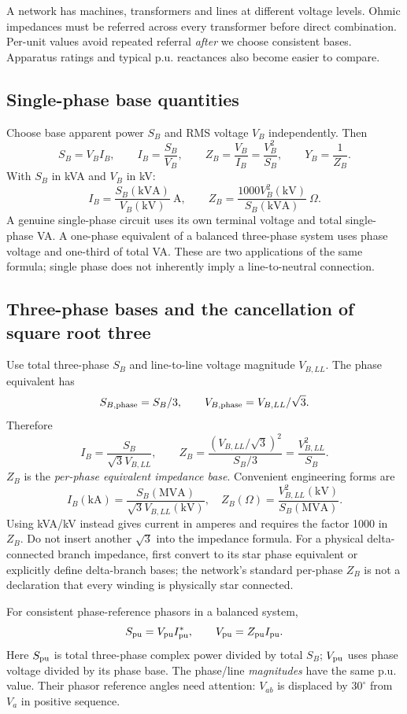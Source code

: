 \documentclass[11pt,a4paper]{article}
\newcommand{\ans}[1]{\boxed{#1}}
\begin{document}
A network has machines, transformers and lines at different voltage levels. Ohmic impedances must be referred across every transformer before direct combination. Per-unit values avoid repeated referral \emph{after} we choose consistent bases. Apparatus ratings and typical p.u. reactances also become easier to compare.
\subsection{Single-phase base quantities}
Choose base apparent power $S_B$ and RMS voltage $V_B$ independently. Then
\[
 S_B=V_B I_B,\qquad I_B=\frac{S_B}{V_B},\qquad
 Z_B=\frac{V_B}{I_B}=\frac{V_B^2}{S_B},\qquad Y_B=\frac1{Z_B}.
\]
With $S_B$ in kVA and $V_B$ in kV:
\[
 I_B=\frac{S_B(\mathrm{kVA})}{V_B(\mathrm{kV})}\ \mathrm A,\qquad
 Z_B=\frac{1000V_B^2(\mathrm{kV})}{S_B(\mathrm{kVA})}\ \Omega.
\]
A genuine single-phase circuit uses its own terminal voltage and total single-phase VA. A one-phase equivalent of a balanced three-phase system uses phase voltage and one-third of total VA. These are two applications of the same formula; single phase does not inherently imply a line-to-neutral connection.
\subsection{Three-phase bases and the cancellation of square root three}
Use total three-phase $S_B$ and line-to-line voltage magnitude $V_{B,LL}$. The phase equivalent has
\[
 S_{B,\rm phase}=S_B/3,\qquad V_{B,\rm phase}=V_{B,LL}/\sqrt3.
\]
Therefore
\[
 \ans{I_B=\frac{S_B}{\sqrt3V_{B,LL}}},\qquad
 \ans{Z_B=\frac{(V_{B,LL}/\sqrt3)^2}{S_B/3}=\frac{V_{B,LL}^2}{S_B}}.
\]
$Z_B$ is the \emph{per-phase equivalent impedance base}. Convenient engineering forms are
\[
 I_B(\mathrm{kA})=\frac{S_B(\mathrm{MVA})}{\sqrt3V_{B,LL}(\mathrm{kV})},\quad
 Z_B(\Omega)=\frac{V_{B,LL}^2(\mathrm{kV})}{S_B(\mathrm{MVA})}.
\]
Using kVA/kV instead gives current in amperes and requires the factor 1000 in $Z_B$. Do not insert another $\sqrt3$ into the impedance formula. For a physical delta-connected branch impedance, first convert to its star phase equivalent or explicitly define delta-branch bases; the network's standard per-phase $Z_B$ is not a declaration that every winding is physically star connected.

For consistent phase-reference phasors in a balanced system,
\[
 S_{\rm pu}=V_{\rm pu}I_{\rm pu}^*,\qquad V_{\rm pu}=Z_{\rm pu}I_{\rm pu}.
\]
Here $S_{\rm pu}$ is total three-phase complex power divided by total $S_B$; $V_{\rm pu}$ uses phase voltage divided by its phase base. The phase/line \emph{magnitudes} have the same p.u. value. Their phasor reference angles need attention: $V_{ab}$ is displaced by $30^\circ$ from $V_a$ in positive sequence.
\end{document}
